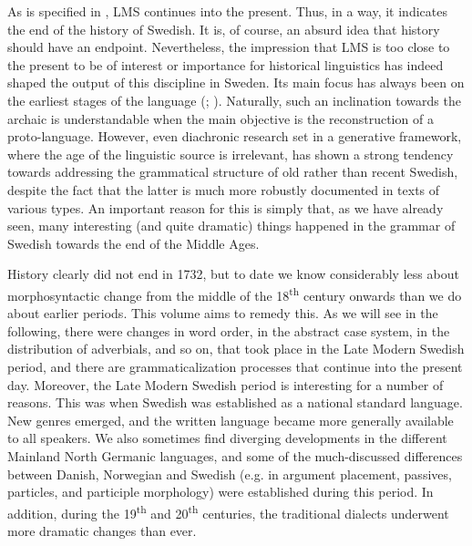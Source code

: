 \documentclass[output=paper]{langscibook}
\begin{document}
As is specified in , LMS continues into the present. Thus, in a way, it indicates the end of the history of Swedish. It is, of course, an absurd idea that history should have an endpoint. Nevertheless, the impression that LMS is too close to the present to be of interest or importance for historical linguistics has indeed shaped the output of this discipline in Sweden. Its main focus has always been on the earliest stages of the language (\citealt{Wollin1988}; \citealt{Haapamaki2010}). Naturally, such an inclination towards the archaic is understandable when the main objective is the reconstruction of a proto-language. However, even diachronic research set in a generative framework, where the age of the linguistic source is irrelevant, has shown a strong tendency towards addressing the grammatical structure of old rather than recent Swedish, despite the fact that the latter is much more robustly documented in texts of various types. An important reason for this is simply that, as we have already seen, many interesting (and quite dramatic) things happened in the grammar of Swedish towards the end of the Middle Ages.



History clearly did not end in 1732, but to date we know considerably less about morphosyntactic change from the middle of the 18\textsuperscript{th} century onwards than we do about earlier periods. This volume aims to remedy this. As we will see in the following, there were changes in word order, in the abstract case system, in the distribution of adverbials, and so on, that took place in the Late Modern Swedish period, and there are grammaticalization processes that continue into the present day. Moreover, the Late Modern Swedish period is interesting for a number of reasons. This was when Swedish was established as a national standard language. New genres emerged, and the written language became more generally available to all speakers. We also sometimes find diverging developments in the different Mainland North Germanic languages, and some of the much-discussed differences between Danish, Norwegian and Swedish (e.g. in argument placement, passives, particles, and participle morphology) were established during this period. In addition, during the 19\textsuperscript{th} and 20\textsuperscript{th} centuries, the traditional dialects underwent more dramatic changes than ever. 
\end{document}
